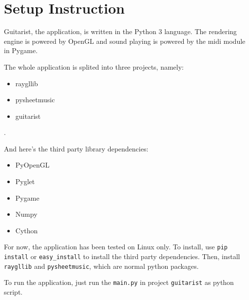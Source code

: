 \chapter{Setup Instruction}
\label{Appendix:Setup-Instruction}

Guitarist, the application, is written in the Python 3 language. The rendering engine is powered by OpenGL and sound playing is powered by the midi module in Pygame.

The whole application is splited into three projects, namely: 
\begin{itemize}
    \item raygllib
    \item pysheetmusic
    \item guitarist
\end{itemize}.

And here's the third party library dependencies:
\begin{itemize}
    \item PyOpenGL
    \item Pyglet
    \item Pygame
    \item Numpy
    \item Cython
\end{itemize}

For now, the application has been tested on Linux only.
To install, use \verb|pip install| or \verb|easy_install| to install the third party dependencies. Then, install \verb|raygllib| and \verb|pysheetmusic|, which are normal python packages.

To run the application, just run the \verb|main.py| in project \verb|guitarist| as python script.
